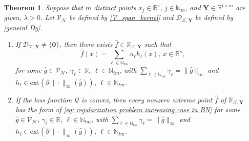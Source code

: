 \documentclass[11pt]{article}
\newtheorem{theorem}{Theorem}
\begin{document}
\begin{theorem}\label{theorem: representer for regularization}
    Suppose that $m$ distinct points $x_j\in\mathbb{R}^s$, $j\in\mathbb{N}_m$, and $\mathbf{Y}\in\mathbb{R}^{t\times m}$ are given, $\lambda>0$. Let $\mathcal{V}_{\mathcal{N}}$ be defined by \eqref{V_span_kernel} and $\mathcal{D}_{\mathcal{X},\mathbf{Y}}$ be defined by \eqref{general Dy}.  
    \begin{enumerate}
    \item If $\mathcal{D}_{\mathcal{X},\mathbf{Y}}\neq\{\mathbf{0}\}$, then there exists $\hat f\in\mathbb{R}_{\mathcal{X},\mathbf{Y}}$ such that 
    \begin{equation}\label{eq: regularization problem increasing case in BN}
        \hat f(x)=\sum\limits_{\ell\in\mathbb{N}_{tm}} \alpha_\ell h_\ell(x),\ x\in\mathbb{R}^s,
    \end{equation}
   for some $\hat g\in\mathcal{V}_{\mathcal{N}}$, $\gamma_\ell\in\mathbb{R}$, $\ell\in\mathbb{N}_{tm}$, with $\sum_{\ell\in\mathbb{N}_{tm}}\gamma_\ell=\|\hat g\|_{\infty}$ and $h_\ell\in\mathrm{ext}(\partial\|\cdot\|_\infty(\hat g))$, $\ell\in\mathbb{N}_{tm}$.
    \item If the loss function $\mathcal{Q}$ is convex, then every nonzero extreme point $\hat f$ of $\mathbb{R}_{\mathcal{X},\mathbf{Y}}$ has the form of
    \eqref{eq: regularization problem increasing case in BN} for some $\hat g\in\mathcal{V}_{\mathcal{N}}$, $\gamma_\ell\in\mathbb{R}$, $\ell\in\mathbb{N}_{tm}$, with  $\sum_{\ell\in\mathbb{N}_{tm}}\gamma_\ell=\|\hat g\|_{\infty}$ and $h_\ell\in\mathrm{ext}(\partial\|\cdot\|_\infty(\hat g))$, $\ell\in\mathbb{N}_{tm}$.
    \end{enumerate}
\end{theorem}
\end{document}
